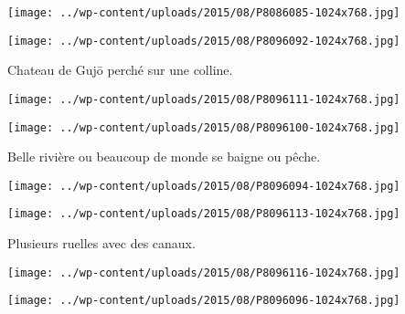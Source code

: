  

 

\begin{center} \texttt{[image: ../wp-content/uploads/2015/08/P8086085-1024x768.jpg]} \end{center}

 

 

\begin{center} \texttt{[image: ../wp-content/uploads/2015/08/P8096092-1024x768.jpg]} \end{center}

 

 Chateau de Gujō perché sur une colline. 

 

\begin{center} \texttt{[image: ../wp-content/uploads/2015/08/P8096111-1024x768.jpg]} \end{center}

 

 

\begin{center} \texttt{[image: ../wp-content/uploads/2015/08/P8096100-1024x768.jpg]} \end{center}

 

 Belle rivière ou beaucoup de monde se baigne ou pêche. 

 

\begin{center} \texttt{[image: ../wp-content/uploads/2015/08/P8096094-1024x768.jpg]} \end{center}

 

 

\begin{center} \texttt{[image: ../wp-content/uploads/2015/08/P8096113-1024x768.jpg]} \end{center}

 

 Plusieurs ruelles avec des canaux. 

 

\begin{center} \texttt{[image: ../wp-content/uploads/2015/08/P8096116-1024x768.jpg]} \end{center}

 

 

\begin{center} \texttt{[image: ../wp-content/uploads/2015/08/P8096096-1024x768.jpg]} \end{center}

